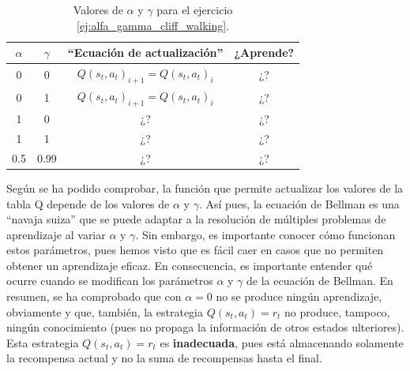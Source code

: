 \documentclass{article}
\begin{document}
\begin{table}[t]
\centering
\begin{tabular}{|c|c|c|c|}
\hline
 $\alpha$ & $\gamma$  & ``Ecuación de actualización''  & ¿Aprende?   \\\hline
 0 & 0 & 
$Q(s_t,a_t)_{i+1} = Q(s_t,a_t)_{i}$ & ¿?\\\hline
 0 & 1 & $Q(s_t,a_t)_{i+1} = Q(s_t,a_t)_{i}$ & ¿?\\\hline
1   & 0  &¿?  &¿?\\\hline
1& 1 & ¿? & ¿?\\\hline
0.5 & 0.99 & ¿? & ¿?\\\hline
\end{tabular}
\caption{Valores de $\alpha$ y $\gamma$ para el ejercicio \ref{ej:alfa_gamma_cliff_walking}.}
\label{tab:alfa_gamma_cliff_walking}
\end{table}



Según se ha podido comprobar, la función que permite actualizar los valores de la tabla Q depende de los valores de $\alpha$ y $\gamma$. Así pues, la ecuación de Bellman es una ``navaja suiza'' que se puede adaptar a la resolución de múltiples problemas de aprendizaje al variar $\alpha$ y $\gamma$. Sin embargo, es importante conocer cómo funcionan estos parámetros, pues hemos visto que es fácil caer en casos que no permiten obtener un aprendizaje eficaz. En consecuencia, es importante entender qué ocurre cuando se modifican los parámetros $\alpha$ y $\gamma$ de la ecuación de Bellman. En resumen, se ha comprobado que con $\alpha=0$ no se produce ningún aprendizaje, obviamente y que, también, la estrategia $Q(s_t, a_t)=r_t$ no produce, tampoco, ningún conocimiento (pues no propaga la información de otros estados ulteriores). Esta estrategia $Q(s_t,a_t)=r_t$ es \textbf{inadecuada}, pues está almacenando solamente la recompensa actual y no la suma de recompensas hasta el final. 
\end{document}
